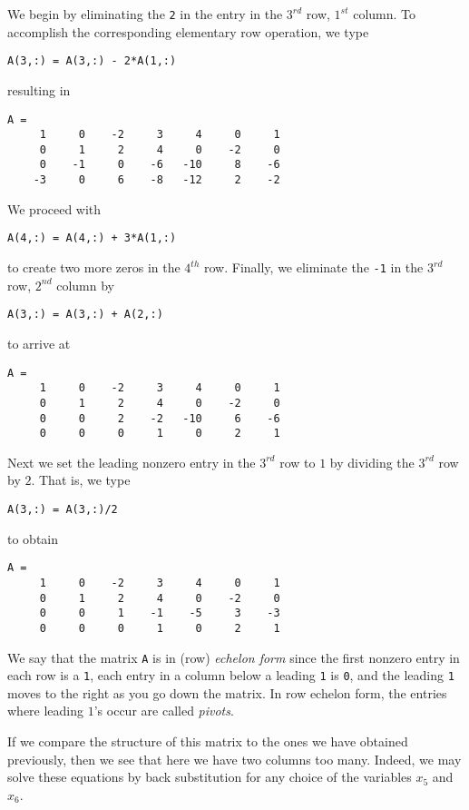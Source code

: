 We begin by eliminating the {\tt 2} in the entry in the $3^{rd}$
row, $1^{st}$ column.  To accomplish the corresponding
elementary row operation, we type
\begin{verbatim}
A(3,:) = A(3,:) - 2*A(1,:)
\end{verbatim}
resulting in
\begin{verbatim}
A =
     1     0    -2     3     4     0     1
     0     1     2     4     0    -2     0
     0    -1     0    -6   -10     8    -6
    -3     0     6    -8   -12     2    -2
\end{verbatim}
We proceed with
\begin{verbatim}
A(4,:) = A(4,:) + 3*A(1,:)
\end{verbatim}
to create two more zeros in the $4^{th}$ row.  Finally, we
eliminate the {\tt -1} in the $3^{rd}$ row, $2^{nd}$
column by
\begin{verbatim}
A(3,:) = A(3,:) + A(2,:)
\end{verbatim}
to arrive at
\begin{verbatim}
A =
     1     0    -2     3     4     0     1
     0     1     2     4     0    -2     0
     0     0     2    -2   -10     6    -6
     0     0     0     1     0     2     1
\end{verbatim}
Next we set the leading nonzero entry in the $3^{rd}$ row to $1$
by dividing the $3^{rd}$ row by $2$.   That is, we type
\begin{verbatim}
A(3,:) = A(3,:)/2
\end{verbatim}
to obtain
\begin{verbatim}
A =
     1     0    -2     3     4     0     1
     0     1     2     4     0    -2     0
     0     0     1    -1    -5     3    -3
     0     0     0     1     0     2     1
\end{verbatim}
We say that the matrix {\tt A} is in (row) {\em echelon form\/}
 since the first nonzero entry in each row
is a {\tt 1}, each entry in a column below a leading {\tt 1} is
{\tt 0}, and the leading {\tt 1} moves to the right as you go
down the matrix.  In row echelon form, the entries where leading
$1$'s occur are called {\em pivots\/}.

If we compare the structure of this matrix to the ones we have
obtained previously, then we see that here we have two columns
too many.  Indeed, we may solve these equations by back
substitution for any choice of the variables $x_5$ and $x_6$.

